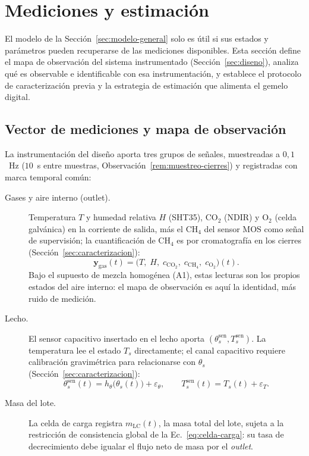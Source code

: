 \section{Mediciones y estimación}\label{sec:mediciones}

El modelo de la Sección~\ref{sec:modelo-general} solo es útil si sus
estados y parámetros pueden recuperarse de las mediciones disponibles.
Esta sección define el mapa de observación del sistema instrumentado
(Sección~\ref{sec:diseno}), analiza qué es observable e identificable
con esa instrumentación, y establece el protocolo de caracterización
previa y la estrategia de estimación que alimenta el gemelo digital.

\subsection{Vector de mediciones y mapa de observación}\label{sec:mapa-obs}

La instrumentación del diseño aporta tres grupos de señales, muestreadas
a $0{,}1$~Hz ($10$~s entre muestras, Observación~\ref{rem:muestreo-cierres})
y registradas con marca temporal común:

\begin{description}
  \item[Gases y aire interno (outlet).] Temperatura $T$ y humedad relativa
  $H$ (SHT35), CO$_2$ (NDIR) y O$_2$ (celda galvánica) en la corriente de salida, más el CH$_4$ del sensor MOS como señal de supervisión; la cuantificación de CH$_4$ es por cromatografía en los cierres (Sección~\ref{sec:caracterizacion}):
  \[
    \mathbf{y}_{\mathrm{gas}}(t) =
    \bigl(T,\; H,\; c_{\mathrm{CO_2}},\; c_{\mathrm{CH_4}},\;
    c_{\mathrm{O_2}}\bigr)(t).
  \]
  Bajo el supuesto de mezcla homogénea (A1), estas lecturas son los
  propios estados del aire interno: el mapa de observación es aquí la
  identidad, más ruido de medición.
  \item[Lecho.] El sensor capacitivo insertado en el lecho aporta
  $(\theta_s^{\mathrm{sen}}, T_s^{\mathrm{sen}})$. La temperatura lee el
  estado $T_s$ directamente; el canal capacitivo requiere calibración
  gravimétrica para relacionarse con $\theta_s$
  (Sección~\ref{sec:caracterizacion}):
  \[
    \theta_s^{\mathrm{sen}}(t) = h_\theta\bigl(\theta_s(t)\bigr) + \varepsilon_\theta,
    \qquad
    T_s^{\mathrm{sen}}(t) = T_s(t) + \varepsilon_T.
  \]
  \item[Masa del lote.] La celda de carga registra $m_{\mathrm{LC}}(t)$,
  la masa total del lote, sujeta a la restricción de consistencia global
  de la Ec.~\eqref{eq:celda-carga}: su tasa de decrecimiento debe
  igualar el flujo neto de masa por el \emph{outlet}.
\end{description}


